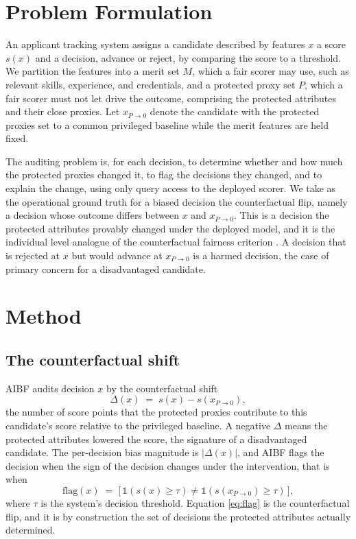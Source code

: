 \documentclass[conference]{IEEEtran}
\begin{document}
\section{Problem Formulation}
\label{sec:problem}
An applicant tracking system assigns a candidate described by features $x$ a score
$s(x)$ and a decision, advance or reject, by comparing the score to a threshold. We
partition the features into a merit set $M$, which a fair scorer may use, such as
relevant skills, experience, and credentials, and a protected proxy set $P$, which a
fair scorer must not let drive the outcome, comprising the protected attributes and
their close proxies. Let $x_{P\to 0}$ denote the candidate with the protected proxies
set to a common privileged baseline while the merit features are held fixed.

The auditing problem is, for each decision, to determine whether and how much the
protected proxies changed it, to flag the decisions they changed, and to explain the
change, using only query access to the deployed scorer. We take as the operational
ground truth for a biased decision the counterfactual flip, namely a decision whose
outcome differs between $x$ and $x_{P\to 0}$. This is a decision the protected
attributes provably changed under the deployed model, and it is the individual level
analogue of the counterfactual fairness criterion \cite{kusner}. A decision that is
rejected at $x$ but would advance at $x_{P\to 0}$ is a harmed decision, the case of
primary concern for a disadvantaged candidate.

\section{Method}
\label{sec:method}

\subsection{The counterfactual shift}
AIBF audits decision $x$ by the counterfactual shift
\begin{equation}
\Delta(x) \;=\; s(x) - s(x_{P\to 0}),
\label{eq:delta}
\end{equation}
the number of score points that the protected proxies contribute to this candidate's
score relative to the privileged baseline. A negative $\Delta$ means the protected
attributes lowered the score, the signature of a disadvantaged candidate. The
per-decision bias magnitude is $|\Delta(x)|$, and AIBF flags the decision when the
sign of the decision changes under the intervention, that is when
\begin{equation}
\mathrm{flag}(x) \;=\; \big[\,\mathbb{1}(s(x)\ge\tau) \neq \mathbb{1}(s(x_{P\to 0})\ge\tau)\,\big],
\label{eq:flag}
\end{equation}
where $\tau$ is the system's decision threshold. Equation \eqref{eq:flag} is the
counterfactual flip, and it is by construction the set of decisions the protected
attributes actually determined.
\end{document}
